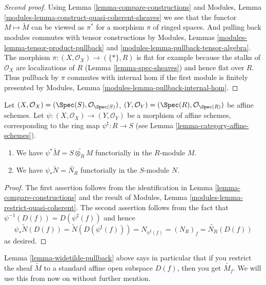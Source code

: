\begin{proof}[Second proof]
Using Lemma \ref{lemma-compare-constructions} and
Modules, Lemma \ref{modules-lemma-construct-quasi-coherent-sheaves}
we see that the functor $M \mapsto \widetilde M$ can be viewed
as $\pi^*$ for a morphism $\pi$ of ringed spaces.
And pulling back modules commutes with tensor constructions by
Modules, Lemmas \ref{modules-lemma-tensor-product-pullback}
and \ref{modules-lemma-pullback-tensor-algebra}.
The morphism $\pi : (X, \mathcal{O}_X) \to (\{*\}, R)$ is
flat for example because the stalks of $\mathcal{O}_X$ are
localizations of $R$ (Lemma \ref{lemma-spec-sheaves})
and hence flat over $R$. Thus pullback by $\pi$ commutes
with internal hom if the first module is finitely presented by
Modules, Lemma \ref{modules-lemma-pullback-internal-hom}.
\end{proof}

\begin{lemma}
\label{lemma-widetilde-pullback}
Let
$(X, \mathcal{O}_X) = (\Spec(S), \mathcal{O}_{\Spec(S)})$,
$(Y, \mathcal{O}_Y) = (\Spec(R), \mathcal{O}_{\Spec(R)})$
be affine schemes.
Let $\psi : (X, \mathcal{O}_X) \to (Y, \mathcal{O}_Y)$ be a
morphism of affine schemes, corresponding to the ring map
$\psi^\sharp : R \to S$ (see Lemma \ref{lemma-category-affine-schemes}).
\begin{enumerate}
\item We have $\psi^* \widetilde M = \widetilde{S \otimes_R M}$
functorially in the $R$-module $M$.
\item We have $\psi_* \widetilde N = \widetilde{N_R}$ functorially
in the $S$-module $N$.
\end{enumerate}
\end{lemma}

\begin{proof}
The first assertion follows from the identification in
Lemma \ref{lemma-compare-constructions}
and the result of Modules, Lemma \ref{modules-lemma-restrict-quasi-coherent}.
The second assertion follows from the fact
that $\psi^{-1}(D(f)) = D(\psi^\sharp(f))$ and hence
$$
\psi_* \widetilde N(D(f)) = \widetilde N(D(\psi^\sharp(f))) =
N_{\psi^\sharp(f)} = (N_R)_f = \widetilde{N_R}(D(f))
$$
as desired.
\end{proof}

\noindent
Lemma \ref{lemma-widetilde-pullback} above says in particular
that if you restrict
the sheaf $\widetilde M$ to a standard affine open subspace
$D(f)$, then you get $\widetilde{M_f}$. We will use this from
now on without further mention.

